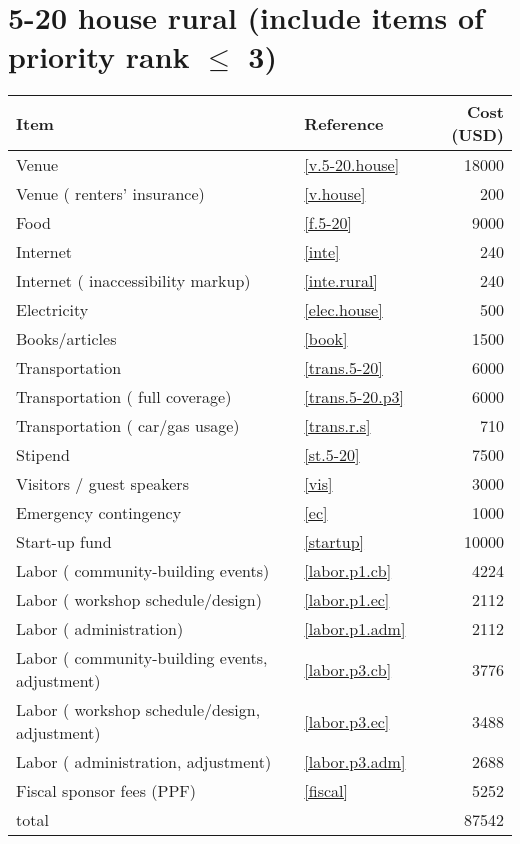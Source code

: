 \section*{5-20 house rural (include items of priority rank $\leq$ 3)}
\begin{center}
\begin{tabular}{llr}
Item & Reference & Cost (USD) \\ \hline
Venue & \ref{v.5-20.house} & 18000 \\
Venue ( renters' insurance) & \ref{v.house} & 200 \\
Food & \ref{f.5-20} & 9000 \\
Internet & \ref{inte} & 240 \\
Internet ( inaccessibility markup) & \ref{inte.rural} & 240 \\
Electricity & \ref{elec.house} & 500 \\
Books/articles & \ref{book} & 1500 \\
Transportation & \ref{trans.5-20} & 6000 \\
Transportation ( full coverage) & \ref{trans.5-20.p3} & 6000 \\
Transportation ( car/gas usage) & \ref{trans.r.s} & 710 \\
Stipend & \ref{st.5-20} & 7500 \\
Visitors / guest speakers & \ref{vis} & 3000 \\
Emergency contingency & \ref{ec} & 1000 \\
Start-up fund & \ref{startup} & 10000 \\
Labor ( community-building events) & \ref{labor.p1.cb} & 4224 \\
Labor ( workshop schedule/design) & \ref{labor.p1.ec} & 2112 \\
Labor ( administration) & \ref{labor.p1.adm} & 2112 \\
Labor ( community-building events, adjustment) & \ref{labor.p3.cb} & 3776 \\
Labor ( workshop schedule/design, adjustment) & \ref{labor.p3.ec} & 3488 \\
Labor ( administration, adjustment) & \ref{labor.p3.adm} & 2688 \\
Fiscal sponsor fees (PPF) & \ref{fiscal} & 5252 \\ \hline
total &  & 87542
\end{tabular}
\end{center}
\newpage
